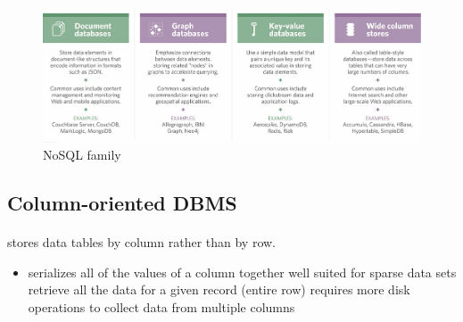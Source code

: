 \documentclass[paper=letter, fontsize=12pt]{article}
\begin{document}
\begin{figure}[H]
	\bgroup
	\setlength{\parindent}{-5em}
	\includegraphics[width=550px]{refs/data_management-nosql.jpg}
	\egroup
	\caption{NoSQL family}
\end{figure}


\subsection{Column-oriented DBMS}
	\paragraph{} stores data tables by column rather than by row.
	\begin{itemize}
		\item serializes all of the values of a column together
		\tick well suited for sparse data sets
		\fail retrieve all the data for a given record (entire row) requires more disk operations to collect data from multiple columns
	\end{itemize}
\end{document}

